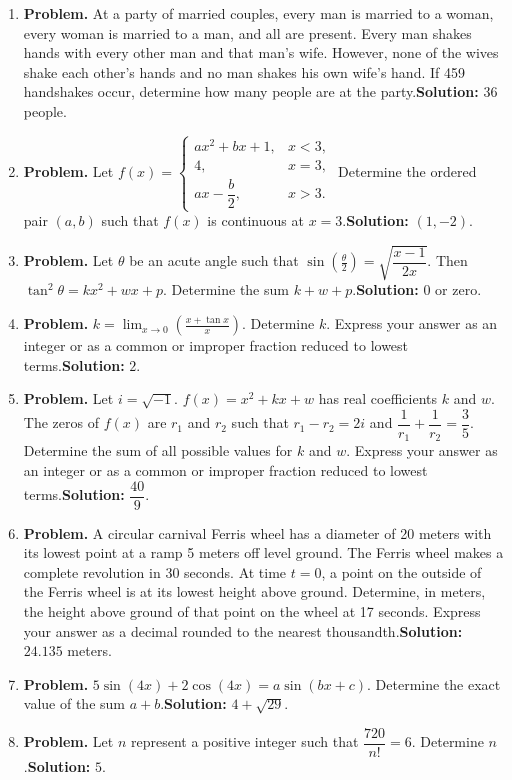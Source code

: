 \documentclass[10pt]{article}
\begin{document}
\begin{enumerate}
  \item \textbf{Problem.} At a party of married couples, every man is married to a woman, every woman is married to a man, and all are present. Every man shakes hands with every other man and that man's wife. However, none of the wives shake each other's hands and no man shakes his own wife's hand. If 459 handshakes occur, determine how many people are at the party.\quad \textbf{Solution:} $36$ people.
  \item \textbf{Problem.} Let $f(x)=\begin{cases} ax^2+bx+1,&x<3,\\4,&x=3,\\ax-\dfrac b2,&x>3.\end{cases}$ Determine the ordered pair $(a,b)$ such that $f(x)$ is continuous at $x=3$.\quad \textbf{Solution:} $(1,-2)$.
  \item \textbf{Problem.} Let $\theta$ be an acute angle such that $\sin\left(\frac\theta2\right)=\sqrt{\dfrac{x-1}{2x}}$. Then $\tan^2\theta=kx^2+wx+p$. Determine the sum $k+w+p$.\quad \textbf{Solution:} $0$ or zero.
  \item \textbf{Problem.} $\displaystyle k=\lim_{x\to0}\left(\frac{x+\tan x}{x}\right)$. Determine $k$. Express your answer as an integer or as a common or improper fraction reduced to lowest terms.\quad \textbf{Solution:} $2$.
  \item \textbf{Problem.} Let $i=\sqrt{-1}$. $f(x)=x^2+kx+w$ has real coefficients $k$ and $w$. The zeros of $f(x)$ are $r_1$ and $r_2$ such that $r_1-r_2=2i$ and $\dfrac1{r_1}+\dfrac1{r_2}=\dfrac35$. Determine the sum of all possible values for $k$ and $w$. Express your answer as an integer or as a common or improper fraction reduced to lowest terms.\quad \textbf{Solution:} $\dfrac{40}{9}$.
  \item \textbf{Problem.} A circular carnival Ferris wheel has a diameter of 20 meters with its lowest point at a ramp 5 meters off level ground. The Ferris wheel makes a complete revolution in 30 seconds. At time $t=0$, a point on the outside of the Ferris wheel is at its lowest height above ground. Determine, in meters, the height above ground of that point on the wheel at 17 seconds. Express your answer as a decimal rounded to the nearest thousandth.\quad \textbf{Solution:} $24.135$ meters.
  \item \textbf{Problem.} $5\sin(4x)+2\cos(4x)=a\sin(bx+c)$. Determine the exact value of the sum $a+b$.\quad \textbf{Solution:} $4+\sqrt{29}$.
  \item \textbf{Problem.} Let $n$ represent a positive integer such that $\dfrac{720}{n!}=6$. Determine $n$.\quad \textbf{Solution:} $5$.

\end{enumerate}
\end{document}
